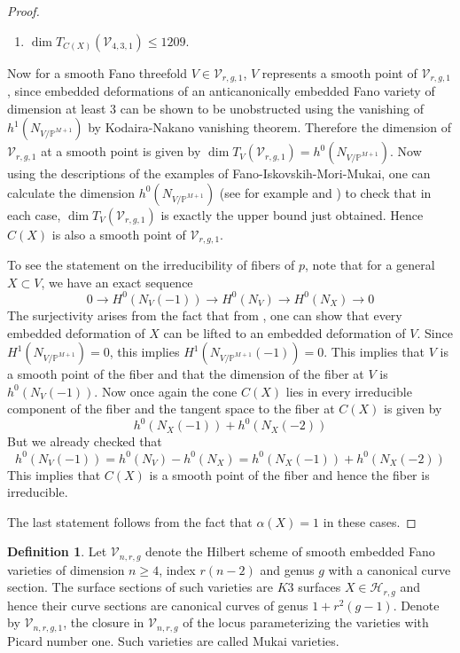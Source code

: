 \documentclass[11pt,twoside]{amsart}
\theoremstyle{plain}
\numberwithin{equation}{section}
\theoremstyle{definition}
\newtheorem{definition}[theorem]{Definition}
\begin{document}
\begin{proof}
\begin{enumerate}
      \item $\operatorname{dim}T_{C(X)}(\mathcal{V}_{4,3,1}) \leq 1209$.
  \end{enumerate}
Now for a smooth Fano threefold $V \in \mathcal{V}_{r,g,1}$, $V$ represents a smooth point of $\mathcal{V}_{r,g,1}$, since embedded deformations of an anticanonically embedded Fano variety of dimension at least $3$ can be shown to be unobstructed using the vanishing of $h^1(N_{V/\mathbb{P}^{M+1}})$ by Kodaira-Nakano vanishing theorem. Therefore the dimension of $\mathcal{V}_{r,g,1}$ at a smooth point is given by $\operatorname{dim}T_V(\mathcal{V}_{r,g,1}) = h^0(N_{V/\mathbb{P}^{M+1}})$. Now using the descriptions of the examples of Fano-Iskovskih-Mori-Mukai, one can calculate the dimension $h^0(N_{V/\mathbb{P}^{M+1}})$ (see for example \cite[Table $2$, pg $666$]{CLM93} and \cite[Table $3.1$]{CLM98}) to check that in each case, $\operatorname{dim}T_V(\mathcal{V}_{r,g,1})$ is exactly the upper bound just obtained. Hence $C(X)$ is also a smooth point of $\mathcal{V}_{r,g,1}$. \par
To see the statement on the irreducibility of fibers of $p$, note that for a general $X \subset V$, we have an exact sequence 
$$0 \to H^0(N_V(-1)) \to H^0(N_V) \to H^0(N_X) \to 0$$
The surjectivity arises from the fact that from , one can show that every embedded deformation of $X$ can be lifted to an embedded deformation of $V$. Since $H^1(N_{V/\mathbb{P}^{M+1}}) = 0$, this implies $H^1(N_{V/\mathbb{P}^{M+1}}(-1)) = 0$. This implies that $V$ is a smooth point of the fiber and that the dimension of the fiber at $V$ is $h^0(N_V(-1))$. Now once again the cone $C(X)$ lies in every irreducible component of the fiber and the tangent space to the fiber at $C(X)$ is given by 
$$h^0(N_X(-1))+h^0(N_X(-2))$$
But we already checked that 
$$h^0(N_V(-1)) = h^0(N_V) - h^0(N_X) = h^0(N_X(-1))+h^0(N_X(-2))$$
This implies that $C(X)$ is a smooth point of the fiber and hence the fiber is irreducible. \par
The last statement follows from the fact that $\alpha(X) = 1$ in these cases. 

  
\end{proof}

\color{black}
\begin{definition}\label{Mukai varieties}
Let $\mathcal{V}_{n,r,g}$ denote the Hilbert scheme of smooth embedded Fano varieties of dimension $n \geq 4$, index $r(n-2)$ and genus $g$ with a canonical curve section. The surface sections of such varieties are $K3$ surfaces $X \in \mathcal{H}_{r,g}$ and hence their curve sections are canonical curves of genus $1+r^2(g-1)$. Denote by $\mathcal{V}_{n,r,g,1}$, the closure in $\mathcal{V}_{n,r,g}$ of the locus parameterizing the varieties with Picard number one. Such varieties are called Mukai varieties.
\end{definition}
\end{document}
